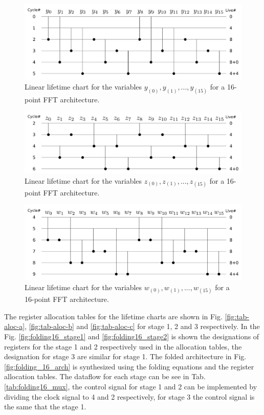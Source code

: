 \documentclass[journal,comsoc]{IEEEtran}
\begin{document}
\begin{figure}
\centering
 \includegraphics[width=\linewidth]{Diagramas/life_chart_a.png}
\caption{Linear lifetime chart for the variables $y_{(0)}, y_{(1)},...,y_{(15)}$ for a 16-point FFT architecture.}
\label{fig:tab-life-a}
\end{figure}
\begin{figure}
\centering
 \includegraphics[width=\linewidth]{Diagramas/life_chart_b.png}
\caption{Linear lifetime chart for the variables $z_{(0)}, z_{(1)},...,z_{(15)}$ for a 16-point FFT architecture.}
\label{fig:tab-life-b}
\end{figure}
\begin{figure}
\centering
 \includegraphics[width=\linewidth]{Diagramas/life_chart_c.png}
\caption{Linear lifetime chart for the variables $w_{(0)}, w_{(1)},...,w_{(15)}$ for a 16-point FFT architecture.}
\label{fig:tab-life-c}
\end{figure}

The register allocation tables for the lifetime charts are shown in Fig. \ref{fig:tab-aloc-a}, \ref{fig:tab-aloc-b} and \ref{fig:tab-aloc-c} for stage 1, 2 and 3 respectively. In the Fig. \ref{fig:folding16_stage1} and \ref{fig:folding16_stage2} is shown the designations of registers for the stage 1 and 2 respectively used in the allocation tables, the designation for stage 3 are similar for stage 1. The folded architecture in Fig. \ref{fig:folding_16_arch} is synthesized using the folding equations and the register allocation tables. The dataflow for each stage can be see in Tab. \ref{tab:folding16_mux}, the control signal for stage 1 and 2 can be implemented by dividing the clock signal to 4 and 2 respectively, for stage 3 the control signal is the same that the stage 1.
\end{document}

